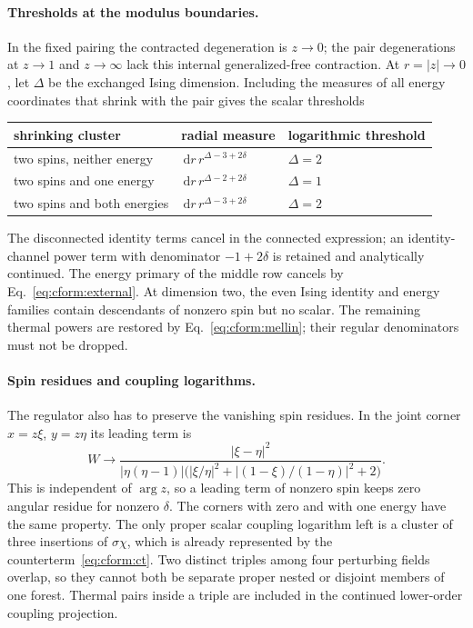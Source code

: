 \documentclass[11pt,a4paper]{article}
\numberwithin{equation}{section}
\newcommand{\dd}{\,\mathrm d}
\begin{document}
\paragraph{Thresholds at the modulus boundaries.} In the fixed pairing the contracted degeneration is $z\to0$; the
pair degenerations at $z\to1$ and $z\to\infty$ lack this internal generalized-free contraction. At $r=|z|\to0$, let
$\Delta$ be the exchanged Ising dimension. Including the measures of all energy coordinates that shrink with the pair
gives the scalar thresholds
\begin{center}\small
\begin{tabular}{@{}lll@{}}
\toprule
shrinking cluster & radial measure & logarithmic threshold\\
\midrule
two spins, neither energy & $\dd r\,r^{\Delta-3+2\delta}$ & $\Delta=2$\\
two spins and one energy & $\dd r\,r^{\Delta-2+2\delta}$ & $\Delta=1$\\
two spins and both energies & $\dd r\,r^{\Delta-3+2\delta}$ & $\Delta=2$\\
\bottomrule
\end{tabular}
\end{center}
The disconnected identity terms cancel in the connected expression; an identity-channel power term with denominator
$-1+2\delta$ is retained and analytically continued. The energy primary of the middle row cancels by
Eq.~\eqref{eq:cform:external}. At dimension two, the even Ising identity and energy families contain descendants of
nonzero spin but no scalar. The remaining thermal powers are restored by Eq.~\eqref{eq:cform:mellin}; their regular
denominators must not be dropped.

\paragraph{Spin residues and coupling logarithms.} The regulator also has to preserve the vanishing spin residues. In
the joint corner $x=z\xi$, $y=z\eta$ its leading term is
\begin{equation}
 W\longrightarrow\frac{|\xi-\eta|^2}{|\eta(\eta-1)|\bigl(|\xi/\eta|^2+|(1-\xi)/(1-\eta)|^2+2\bigr)}.
\end{equation}
This is independent of $\arg z$, so a leading term of nonzero spin keeps zero angular residue for nonzero $\delta$. The
corners with zero and with one energy have the same property. The only proper scalar coupling logarithm left is a
cluster of three insertions of $\sigma\chi$, which is already represented by the counterterm~\eqref{eq:cform:ct}. Two
distinct triples among four perturbing fields overlap, so they cannot both be separate proper nested or disjoint
members of one forest. Thermal pairs inside a triple are included in the continued lower-order coupling projection.
\end{document}
